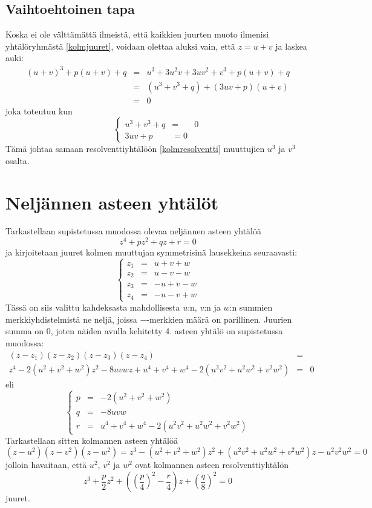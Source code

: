 \documentclass[a4paper]{article}
\begin{document}
\subsection{Vaihtoehtoinen tapa}
Koska ei ole välttämättä ilmeistä, että kaikkien juurten muoto ilmenisi yhtälöryhmästä \ref{kolmjuuret}, voidaan olettaa aluksi vain, että $z=u+v$ ja laskea auki:
\begin{eqnarray*}
  (u+v)^3+p(u+v)+q & = & u^3+3u^2 v+3uv^2+v^3+p(u+v)+q \\
  & = & (u^3+v^3+q) + (3uv+p)(u+v) \\
  & = & 0
\end{eqnarray*}
joka toteutuu kun
$$
\left\{
\begin{array}{ccc}
  u^3+v^3+q & = & 0 \\
  3uv+p & = 0
\end{array}
\right.
$$
Tämä johtaa samaan resolventtiyhtälöön \ref{kolmresolventti} muuttujien $u^3$ ja $v^3$ osalta.
\section{Neljännen asteen yhtälöt}
Tarkastellaan supistetussa muodossa olevaa neljännen asteen yhtälöä
$$
z^4+pz^2+qz+r=0
$$
ja kirjoitetaan juuret kolmen muuttujan symmetrisinä lausekkeina seuraavasti:
$$
\left\{
\begin{array}{ccc}
  z_1 & = & u+v+w \\
  z_2 & = & u-v-w \\
  z_3 & = & -u+v-w \\
  z_4 & = & -u-v+w
\end{array}
\right.
$$
Tässä on siis valittu kahdeksasta mahdollisesta $u$:n, $v$:n ja $w$:n summien merkkiyhdistelmistä ne neljä, joissa $-$-merkkien määrä on parillinen. Juurien summa on $0$, joten näiden avulla kehitetty 4. asteen yhtälö on supistetussa muodossa:
\begin{eqnarray*}
  (z-z_1)(z-z_2)(z-z_3)(z-z_4) & = & \\
  z^4-2(u^2+v^2+w^2)z^2-8uvwz+u^4+v^4+w^4-2(u^2 v^2+u^2 w^2+v^2 w^2) & = & 0
\end{eqnarray*}
eli
$$
\left\{
\begin{array}{ccc}
  p & = & -2(u^2+v^2+w^2) \\
  q & = & -8uvw \\
  r & = & u^4+v^4+w^4-2(u^2 v^2+u^2 w^2+v^2 w^2)
\end{array}
\right.
$$
Tarkastellaan sitten kolmannen asteen yhtälöä
$$
(z-u^2)(z-v^2)(z-w^2)=z^3-(u^2+v^2+w^2)z^2+(u^2 v^2+u^2 w^2+v^2 w^2)z-u^2 v^2 w^2=0
$$
jolloin havaitaan, että $u^2$, $v^2$ ja $w^2$ ovat kolmannen asteen resolventtiyhtälön
$$
z^3+\frac{p}{2}z^2+\left(\left(\frac{p}{4}\right)^2-\frac{r}{4}\right)z+\left(\frac{q}{8}\right)^2=0
$$
juuret.
\end{document}
